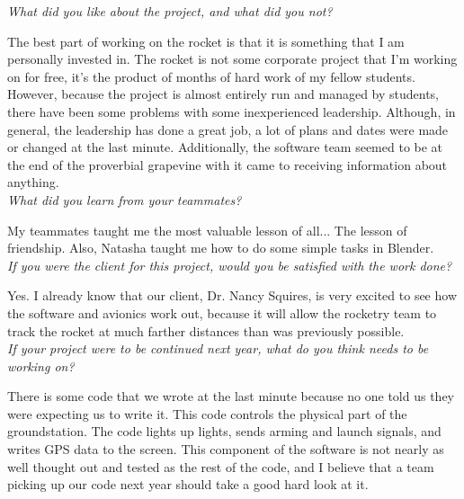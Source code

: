 \documentclass[10pt,draftclsnofoot,onecolumn]{IEEEtran}
\begin{document}
\begin{itemize}
	\textit{What did you like about the project, and what did you not?}

	The best part of working on the rocket is that it is something that I am personally invested in. The rocket is not some corporate project that I'm working on for free, it's the product of months of hard work of my fellow students. However, because the project is almost entirely run and managed by students, there have been some problems with some inexperienced leadership. Although, in general, the leadership has done a great job, a lot of plans and dates were made or changed at the last minute. Additionally, the software team seemed to be at the end of the proverbial grapevine with it came to receiving information about anything.\\

	\textit{What did you learn from your teammates?}

	My teammates taught me the most valuable lesson of all... The lesson of friendship. Also, Natasha taught me how to do some simple tasks in Blender.\\

	\textit{If you were the client for this project, would you be satisfied with the work done?}

	Yes. I already know that our client, Dr. Nancy Squires, is very excited to see how the software and avionics work out, because it will allow the rocketry team to track the rocket at much farther distances than was previously possible.\\

	\textit{If your project were to be continued next year, what do you think needs to be working on?}

	There is some code that we wrote at the last minute because no one told us they were expecting us to write it. This code controls the physical part of the groundstation. The code lights up lights, sends arming and launch signals, and writes GPS data to the screen. This component of the software is not nearly as well thought out and tested as the rest of the code, and I believe that a team picking up our code next year should take a good hard look at it.\\
\end{itemize}
\end{document}
